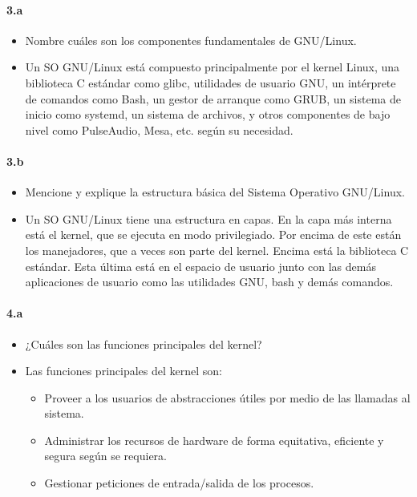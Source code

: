 \documentclass[10pt,a4paper]{paper}
\begin{document}
	
	\paragraph{3.a}
	
	\begin{itemize}
		\item Nombre cuáles son los componentes fundamentales de GNU/Linux.
		
		
		\item Un SO GNU/Linux está compuesto principalmente por el kernel Linux, una
		biblioteca C estándar como glibc, utilidades de usuario GNU, un intérprete de
		comandos como Bash, un gestor de arranque como GRUB, un sistema de inicio como
		systemd, un sistema de archivos,  y otros componentes de bajo nivel como
		PulseAudio, Mesa, etc. según su necesidad.
	\end{itemize}
	
	
	\paragraph{3.b}
	
	\begin{itemize}
		\item Mencione y explique la estructura básica del Sistema Operativo GNU/Linux.
		
		
		\item Un SO GNU/Linux tiene una estructura en capas. En la capa más interna
		está el kernel, que se ejecuta en modo privilegiado. Por encima de este están
		los manejadores, que a veces son parte del kernel. Encima está la biblioteca C
		estándar. Esta última está en el espacio de usuario junto con las demás
		aplicaciones de usuario como las utilidades GNU, bash y demás comandos.
	\end{itemize}
	
	
	
	\paragraph{4.a}
	
	\begin{itemize}
		\item ¿Cuáles son las funciones principales del kernel?
		
		\item Las funciones principales del kernel son:
		\begin{itemize}
			\item Proveer a los usuarios de abstracciones útiles por medio de las llamadas
			al sistema.
			
			\item Administrar los recursos de hardware de forma equitativa, eficiente y
			segura según se requiera.
			
			\item Gestionar peticiones de entrada/salida de los procesos.
		\end{itemize}
	\end{itemize}
	
\end{document}
